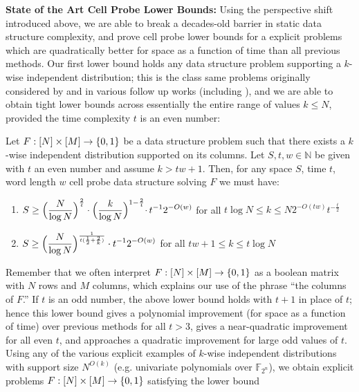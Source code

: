 {\bf \noindent State of the Art Cell Probe Lower Bounds:} Using the perspective shift introduced above, we are able to break a decades-old barrier in static data structure complexity, and prove cell probe lower bounds for a explicit problems which are quadratically better for space as a function of time than all previous methods. Our first lower bound holds any data structure problem supporting a $k$-wise independent distribution; this is the class same problems originally considered by \cite{Siegel89} and in various follow up works (including \cite{panigrahy,kasper}), and we are able to obtain tight lower bounds across essentially the entire range of values $k \leq N$, provided the time complexity $t$ is an even number:
\begin{theorem}
\label{cellprobe:thm:k-wise-lb}

Let $F: [N] \times [M] \to \{0,1\}$ be a data structure problem such that there exists a $k$-wise independent distribution supported on its columns. Let $S,t,w \in \mathbb{N}$ be given with $t$ an even number and assume $k > tw + 1$. Then, for any space $S$, time $t$, word length $w$ cell probe data structure solving $F$ we must have:
\begin{enumerate}
    \item $\begin{aligned}[t]
    S \geq  \Bigl( \frac{N}{\log N}\Bigr)^{\frac{2}{t}} \cdot \Bigl(\frac{k}{\log N}\Bigl)^{1 - \frac{2}{t}}  \cdot\,t^{-1}2^{-O(w)}
  \end{aligned}$ for all $t\log N \leq k \leq N 2^{-O(tw)} t^{-\frac{t}{2}}$
  \item $\begin{aligned}[t]
    S \geq   \Bigl( \frac{N}{\log N}\Bigr)^{\frac{1}{t(\frac{1}{2} + \frac{2}{k})}} \cdot t^{-1}2^{-O(w)}
  \end{aligned}$ for all $tw+1 \leq k \leq t\log N$
\end{enumerate}
\end{theorem}
Remember that we often interpret $F:[N] \times [M] \to \{0,1\}$ as a boolean matrix with $N$ rows and $M$ columns, which explains our use of the phrase ``the columns of $F$.''
If $t$ is an odd number, the above lower bound holds with $t+1$ in place of $t$; hence this lower bound gives a polynomial improvement (for space as a function of time) over previous methods for all $t > 3$, gives a near-quadratic improvement for all even $t$, and approaches a quadratic improvement for large odd values of $t$.  Using any of the various explicit examples of $k$-wise independent distributions with support size $N^{O(k)}$ (e.g. univariate polynomials over $\mathbb{F}_{2^n}$), we obtain explicit problems $F: [N] \times [M] \to \{0,1\}$ satisfying the lower bound
